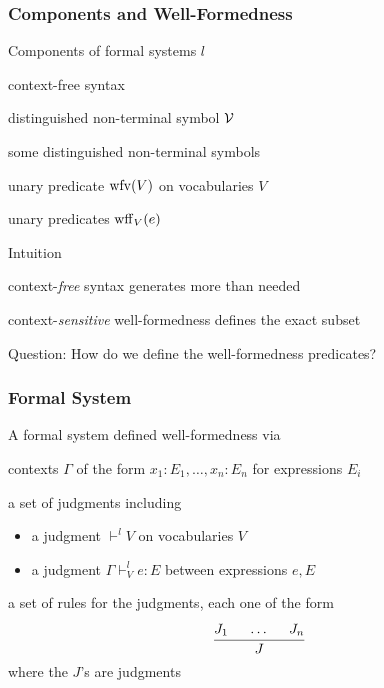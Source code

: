 \begin{frame}\frametitle{Components and Well-Formedness}
\begin{blockitems}{Components of formal systems $l$}
 \item context-free syntax
 \item distinguished non-terminal symbol $\mathcal{V}$ 
 \item some distinguished non-terminal symbols 
 \item unary predicate $\mathrm{wfv}(V)$ on vocabularies $V$ 
 \item unary predicates $\mathrm{wff}_{V}(e)$ 
\end{blockitems}

\begin{blockitems}{Intuition}
\item context-\emph{free} syntax generates more than needed
\item context-\emph{sensitive} well-formedness defines the exact subset
\end{blockitems}

Question: How do we define the well-formedness predicates?
\end{frame}

\begin{frame}\frametitle{Formal System}
\begin{blockitems}{A formal system defined well-formedness via}
\item contexts $\Gamma$ of the form $x_1:E_1,\ldots,x_n:E_n$ for expressions $E_i$
\item a set of judgments including
 \begin{itemize}
  \item a judgment $\vdash^l V$ on vocabularies $V$
  \item a judgment $\Gamma\vdash^l_V e:E$ between expressions $e,E$
 \end{itemize}
\item a set of rules for the judgments, each one of the form
\[\cfrac{J_1 \hspace*{.5cm} \ldots \hspace*{.5cm} J_n}{J}\,\]
where the $J$'s are judgments
\end{blockitems}
\end{frame}

